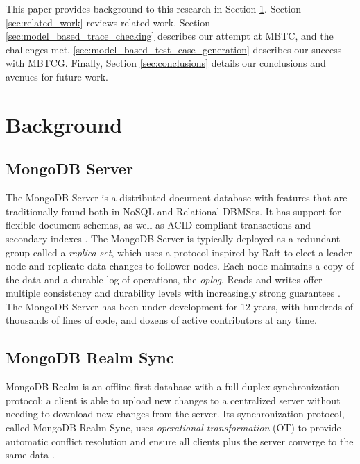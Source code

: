 \documentclass{vldb}
\begin{document}
This paper provides background to this research in Section \ref{sec:background}. 
Section \ref{sec:related_work} reviews related work. 
Section \ref{sec:model_based_trace_checking} describes our attempt at MBTC, and the challenges met. 
\ref{sec:model_based_test_case_generation} describes our success with MBTCG. 
Finally, Section \ref{sec:conclusions} details our conclusions and avenues for future work.

\section{Background}
\label{sec:background}

\subsection{MongoDB Server}
\label{subsec:background_server}

The MongoDB Server is a distributed document database with features that are traditionally found both in NoSQL and Relational DBMSes.
It has support for flexible document schemas, as well as ACID compliant transactions and secondary indexes \cite{Kamsky19TPCCMongoDB}.
The MongoDB Server is typically deployed as a redundant group called a \textit{replica set}, which uses a protocol inspired by Raft \cite{Ongaro14Raft} to elect a leader node and replicate data changes to follower nodes.
Each node maintains a copy of the data and a durable log of operations, the \textit{oplog}.
Reads and writes offer multiple consistency and durability levels with increasingly strong guarantees \cite{Schultz19TunableConsistency, Tyulenev19CausalConsistencyMongoDB}.
The MongoDB Server has been under development for 12 years, with hundreds of thousands of lines of code, and dozens of active contributors at any time.

\subsection{MongoDB Realm Sync}
\label{subsec:background_realm}

MongoDB Realm is an offline-first database with a full-duplex synchronization protocol; a client is able to upload new changes to a centralized server without needing to download new changes from the server. Its synchronization protocol, called MongoDB Realm Sync, uses \textit{operational transformation} (OT) to provide automatic conflict resolution and ensure all clients plus the server converge to the same data \cite{Stigsen19RealmPatent}.
\end{document}
